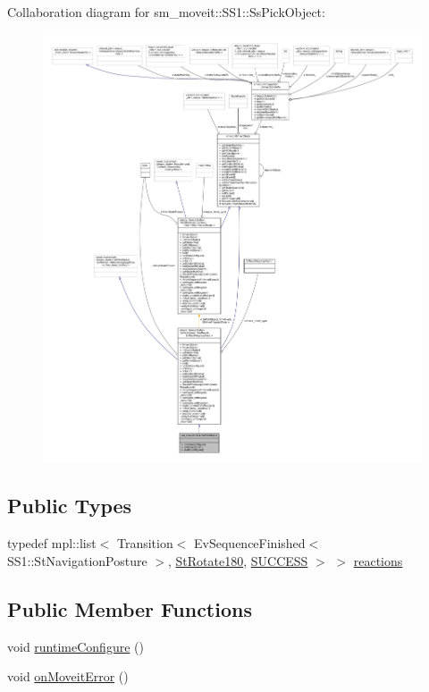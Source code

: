 Collaboration diagram for sm\+\_\+moveit\+:\+:S\+S1\+:\+:Ss\+Pick\+Object\+:
\nopagebreak
\begin{figure}[H]
\begin{center}
\leavevmode
\includegraphics[width=350pt]{structsm__moveit_1_1SS1_1_1SsPickObject__coll__graph}
\end{center}
\end{figure}
\subsection*{Public Types}
\begin{DoxyCompactItemize}
\item 
typedef mpl\+::list$<$ Transition$<$ Ev\+Sequence\+Finished$<$ S\+S1\+::\+St\+Navigation\+Posture $>$, \hyperlink{structsm__moveit_1_1StRotate180}{St\+Rotate180}, \hyperlink{classSUCCESS}{S\+U\+C\+C\+E\+SS} $>$ $>$ \hyperlink{structsm__moveit_1_1SS1_1_1SsPickObject_a6fe2bd5b7184fd5ee2f5def21cc4423e}{reactions}
\end{DoxyCompactItemize}
\subsection*{Public Member Functions}
\begin{DoxyCompactItemize}
\item 
void \hyperlink{structsm__moveit_1_1SS1_1_1SsPickObject_acb8cbbad6e452a98ff2ccf93a6bdd1a4}{runtime\+Configure} ()
\item 
void \hyperlink{structsm__moveit_1_1SS1_1_1SsPickObject_aa5ad4c6436b70a13b27a45936876374c}{on\+Moveit\+Error} ()
\end{DoxyCompactItemize}
